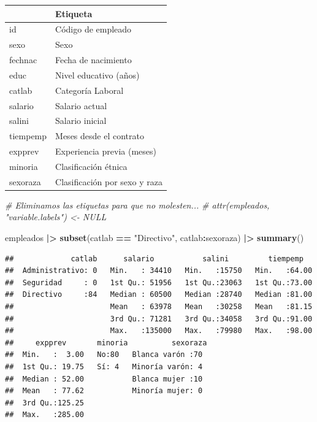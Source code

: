 \documentclass[
]{book}
\newenvironment{Shaded}{\begin{snugshade}}{\end{snugshade}}
\newcommand{\CommentTok}[1]{\textcolor[rgb]{0.56,0.35,0.01}{\textit{#1}}}
\newcommand{\FunctionTok}[1]{\textcolor[rgb]{0.13,0.29,0.53}{\textbf{#1}}}
\newcommand{\NormalTok}[1]{#1}
\newcommand{\SpecialCharTok}[1]{\textcolor[rgb]{0.81,0.36,0.00}{\textbf{#1}}}
\newcommand{\StringTok}[1]{\textcolor[rgb]{0.31,0.60,0.02}{#1}}
\begin{document}
\begin{tabular}{l|l}
\hline
  & Etiqueta\\
\hline
id & Código de empleado\\
\hline
sexo & Sexo\\
\hline
fechnac & Fecha de nacimiento\\
\hline
educ & Nivel educativo (años)\\
\hline
catlab & Categoría Laboral\\
\hline
salario & Salario actual\\
\hline
salini & Salario inicial\\
\hline
tiempemp & Meses desde el contrato\\
\hline
expprev & Experiencia previa (meses)\\
\hline
minoria & Clasificación étnica\\
\hline
sexoraza & Clasificación por sexo y raza\\
\hline
\end{tabular}

\begin{Shaded}
\begin{Highlighting}[]
\CommentTok{\# Eliminamos las etiquetas para que no molesten...}
\CommentTok{\# attr(empleados, "variable.labels") \textless{}{-} NULL  }

\NormalTok{empleados }\SpecialCharTok{|\textgreater{}}  
  \FunctionTok{subset}\NormalTok{(catlab }\SpecialCharTok{==} \StringTok{"Directivo"}\NormalTok{, catlab}\SpecialCharTok{:}\NormalTok{sexoraza) }\SpecialCharTok{|\textgreater{}}
  \FunctionTok{summary}\NormalTok{()}
\end{Highlighting}
\end{Shaded}

\begin{verbatim}
##             catlab      salario           salini         tiempemp    
##  Administrativo: 0   Min.   : 34410   Min.   :15750   Min.   :64.00  
##  Seguridad     : 0   1st Qu.: 51956   1st Qu.:23063   1st Qu.:73.00  
##  Directivo     :84   Median : 60500   Median :28740   Median :81.00  
##                      Mean   : 63978   Mean   :30258   Mean   :81.15  
##                      3rd Qu.: 71281   3rd Qu.:34058   3rd Qu.:91.00  
##                      Max.   :135000   Max.   :79980   Max.   :98.00  
##     expprev       minoria          sexoraza 
##  Min.   :  3.00   No:80   Blanca varón :70  
##  1st Qu.: 19.75   Sí: 4   Minoría varón: 4  
##  Median : 52.00           Blanca mujer :10  
##  Mean   : 77.62           Minoría mujer: 0  
##  3rd Qu.:125.25                             
##  Max.   :285.00
\end{verbatim}
\end{document}
